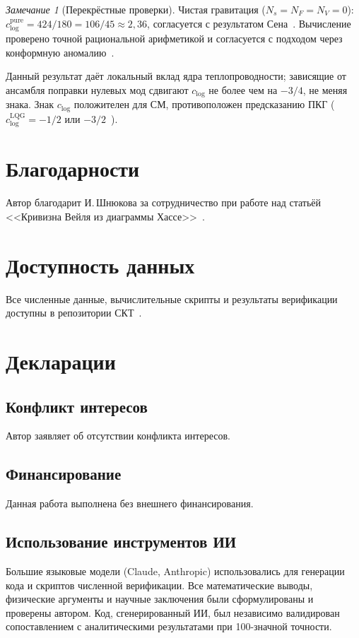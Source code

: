 \documentclass[12pt,a4paper]{article}
\theoremstyle{plain}
\theoremstyle{definition}
\theoremstyle{remark}
\newtheorem{remark}[theorem]{Замечание}
\begin{document}
\begin{remark}[Перекрёстные проверки]
Чистая гравитация ($N_s = N_F = N_V = 0$):
$c_{\log}^{\mathrm{pure}} = 424/180 = 106/45 \approx 2{,}36$,
согласуется с результатом Сена~\cite{Sen:2012}.
Вычисление проверено точной рациональной арифметикой и согласуется
с подходом через конформную аномалию~\cite{BirDav:1982}.

Данный результат даёт локальный вклад ядра теплопроводности;
зависящие от ансамбля поправки нулевых мод сдвигают $c_{\log}$
не более чем на $-3/4$, не меняя знака. Знак $c_{\log}$
положителен для СМ, противоположен предсказанию ПКГ
($c_{\log}^{\mathrm{LQG}} = -1/2$
или $-3/2$~\cite{Meissner:2004,KaulMajumdar:2000}).
\end{remark}

\section*{Благодарности}

Автор благодарит И.\,Шнюкова за сотрудничество при работе над
статьёй <<Кривизна Вейля из диаграммы
Хассе>>~\cite{Alfyorov:2026paper7}.

\section*{Доступность данных}

Все численные данные, вычислительные скрипты и результаты
верификации доступны в репозитории
СКТ~\cite{Alfyorov:2026repo}.

\section*{Декларации}

\subsection*{Конфликт интересов}
Автор заявляет об отсутствии конфликта интересов.

\subsection*{Финансирование}
Данная работа выполнена без внешнего финансирования.

\subsection*{Использование инструментов ИИ}
Большие языковые модели (Claude, Anthropic) использовались для
генерации кода и скриптов численной верификации. Все математические
выводы, физические аргументы и научные заключения были
сформулированы и проверены автором. Код, сгенерированный ИИ, был
независимо валидирован сопоставлением с аналитическими результатами
при 100-значной точности.



\end{document}
